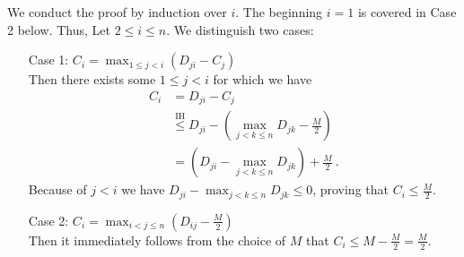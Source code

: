 




	We conduct the proof by induction over $i$. 
	The beginning $i=1$ is covered in Case 2 below. 
	Thus, Let $2 \leq i \leq n$.
	We distinguish two cases:
	\begin{enumerate}[align=left]
		\item[Case 1: $C_i = \max_{1 \leq j < i}(D_{ji} - C_j)$]{\mbox{}\\
			Then there exists some $1 \leq j < i$ for which we have
			\begin{align}
				C_i &= D_{ji} - C_j \\
				&\stackrel{\mathrm{IH}}{\leq} D_{ji} - \left(\max_{j < k \leq n} D_{jk} - \frac{M}{2}\right)\\
				&= (D_{ji} - \max_{j < k \leq n} D_{jk}) + \frac{M}{2} \ .
			\end{align}
			Because of $j < i$ we have $D_{ji} - \max_{j < k \leq n} D_{jk} \leq 0$, proving that $C_i \leq \frac{M}{2}$.
		}
		\item[Case 2: $C_i = \max_{i < j \leq n}(D_{ij} - \frac{M}{2})$]{\mbox{}\\
			Then it immediately follows from the choice of $M$ that $C_i \leq M - \frac{M}{2} = \frac{M}{2}$.
		}
	\end{enumerate}

